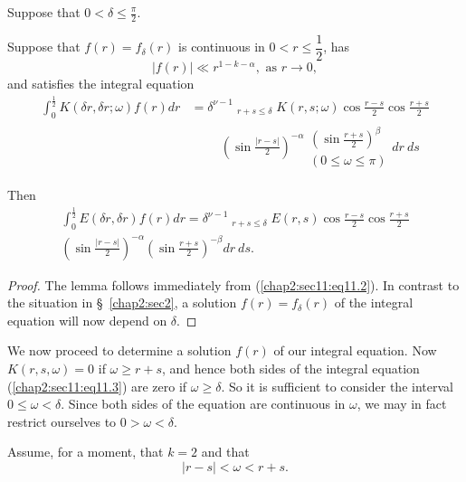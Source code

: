 \begin{lemma}\label{chap2:sec11:lem11A}
Suppose that $0 < \delta \leq \frac{\pi}{2}$.

Suppose that $f(r) = f_{\delta} (r)$ is continuous in $0 < r \leq \dfrac{1}{2}$, has
$$
|f(r)| \ll r^{1-k-\alpha}, \text{ as } r \to 0,
$$
and satisfies the integral equation 
\begin{align*}
 \int_{0}^{\frac{1}{2}}  K(\delta r, \delta r; \omega)  f(r) dr
 & = \delta^{\nu-1} \mathop{\int_{0}^{\delta} \int_{0}^{\delta}}_{r+s \leq \delta} K(r, s ; \omega) \cos \frac{r-s}{2} \cos \frac{r+s}{2}\\ 
 & \hspace{1cm}\left(\sin \frac{|r-s|}{2}\right)^{-\alpha} \substack{\left(\sin \frac{r+s}{2}\right)^{\beta}\\{(0 \leq \omega \leq \pi)}} dr~ ds\tag{11.3}\label{chap2:sec11:eq11.3}
\end{align*}
\end{lemma}

Then\pageoriginale
\begin{multline*}
\int_{0}^{\frac{1}{2}} E(\delta r, \delta r) f(r) dr
 = \delta^{\nu -1} \mathop{\int_{0}^{1} \int_{0}^{1}}_{r+s \leq \delta} E(r, s)\cos \frac{r-s}{2} \cos \frac{r+s}{2}\\ 
\left(\sin \frac{|r-s|}{2}\right)^{-\alpha} \left(\sin \frac{r+s}{2}\right)^{-\beta} dr~ ds. 
\end{multline*}

\begin{proof}
The lemma follows immediately from (\ref{chap2:sec11:eq11.2}). In contrast to the situation in \S\ \ref{chap2:sec2}, a solution $f(r) = f_{\delta} (r)$ of the integral equation will now depend on $\delta$.
\end{proof}

We now proceed to determine a solution $f(r)$ of our integral equation. Now $K(r, s, \omega) = 0$ if $\omega \geq r+s$, and hence both sides of the integral equation (\ref{chap2:sec11:eq11.3}) are zero if $\omega \geq \delta$. So it is sufficient to consider the interval $0 \leq \omega < \delta$. Since both sides of the equation are continuous in $\omega$, we may in fact restrict ourselves to $0 > \omega < \delta$.

Assume, for a moment, that $k = 2$ and that
$$
|r-s| < \omega < r+s.
$$

